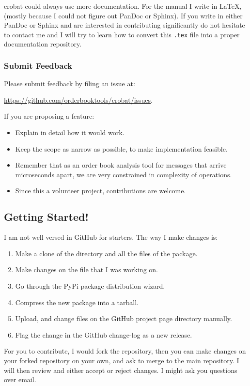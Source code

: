 crobat could always use more documentation. For the manual I write in \LaTeX, (mostly because  I could not figure out PanDoc or Sphinx). If you write in either PanDoc or Sphinx and are interested in contributing significantly do not hesitate to contact me and I will try to learn how to convert this \texttt{.tex} file into a proper documentation repository.

\subsubsection{Submit Feedback}

Please submit feedback by filing an issue at:

\noindent  \href{https://github.com/orderbooktools/crobat/issues}{https://github.com/orderbooktools/crobat/issues}.
\smallskip

\noindent If you are proposing a feature:\begin{itemize}
	\item Explain in detail how it would work.
	\item Keep the scope as narrow as possible, to make implementation feasible.
	\item Remember that as an order book analysis tool for messages that arrive microseconds apart, we are very constrained in complexity of operations.
	\item Since this a volunteer project, contributions are welcome.
\end{itemize}

\subsection{Getting Started!}
I am not well versed in GitHub for starters. The way I make changes is:
\begin{enumerate}
	\item Make a clone of the directory and all the files of the package. 
	\item Make changes on the file that I was working on.
	\item Go through the PyPi package distribution wizard.
	\item Compress the new package into a tarball.
	\item Upload, and change files on the GitHub project page directory manually.
	\item Flag the change in the GitHub change-log as a new release.
\end{enumerate}

\noindent For you to contribute, I would fork the repository, then you can make changes on your forked repository on your own, and ask to merge to the main repository. I will then review and either accept or reject changes. I might ask you questions over email. 
\newpage